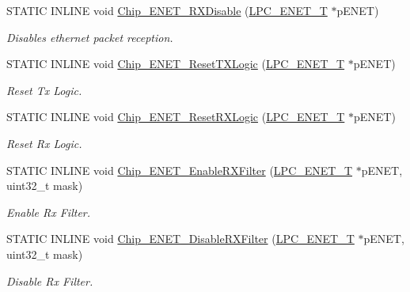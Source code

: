 \begin{DoxyCompactItemize}
S\+T\+A\+T\+I\+C I\+N\+L\+I\+N\+E void \hyperlink{group___e_n_e_t__17_x_x__40_x_x_gaef60a4790dcce43254081ea7fe5a22d4}{Chip\+\_\+\+E\+N\+E\+T\+\_\+\+R\+X\+Disable} (\hyperlink{struct_l_p_c___e_n_e_t___t}{L\+P\+C\+\_\+\+E\+N\+E\+T\+\_\+\+T} $\ast$p\+E\+N\+E\+T)
\begin{DoxyCompactList}\small\item\em Disables ethernet packet reception. \end{DoxyCompactList}\item 
S\+T\+A\+T\+I\+C I\+N\+L\+I\+N\+E void \hyperlink{group___e_n_e_t__17_x_x__40_x_x_ga23cc17a06ee9e42b4f1327cd792a2a8e}{Chip\+\_\+\+E\+N\+E\+T\+\_\+\+Reset\+T\+X\+Logic} (\hyperlink{struct_l_p_c___e_n_e_t___t}{L\+P\+C\+\_\+\+E\+N\+E\+T\+\_\+\+T} $\ast$p\+E\+N\+E\+T)
\begin{DoxyCompactList}\small\item\em Reset Tx Logic. \end{DoxyCompactList}\item 
S\+T\+A\+T\+I\+C I\+N\+L\+I\+N\+E void \hyperlink{group___e_n_e_t__17_x_x__40_x_x_gaddd915f4c5b177bef0cd29d882ed3e6f}{Chip\+\_\+\+E\+N\+E\+T\+\_\+\+Reset\+R\+X\+Logic} (\hyperlink{struct_l_p_c___e_n_e_t___t}{L\+P\+C\+\_\+\+E\+N\+E\+T\+\_\+\+T} $\ast$p\+E\+N\+E\+T)
\begin{DoxyCompactList}\small\item\em Reset Rx Logic. \end{DoxyCompactList}\item 
S\+T\+A\+T\+I\+C I\+N\+L\+I\+N\+E void \hyperlink{group___e_n_e_t__17_x_x__40_x_x_ga87335faab88d9a16579596f4a0a6ce14}{Chip\+\_\+\+E\+N\+E\+T\+\_\+\+Enable\+R\+X\+Filter} (\hyperlink{struct_l_p_c___e_n_e_t___t}{L\+P\+C\+\_\+\+E\+N\+E\+T\+\_\+\+T} $\ast$p\+E\+N\+E\+T, uint32\+\_\+t mask)
\begin{DoxyCompactList}\small\item\em Enable Rx Filter. \end{DoxyCompactList}\item 
S\+T\+A\+T\+I\+C I\+N\+L\+I\+N\+E void \hyperlink{group___e_n_e_t__17_x_x__40_x_x_ga591bdc31e1ca992c3ac642c8d64d3ac9}{Chip\+\_\+\+E\+N\+E\+T\+\_\+\+Disable\+R\+X\+Filter} (\hyperlink{struct_l_p_c___e_n_e_t___t}{L\+P\+C\+\_\+\+E\+N\+E\+T\+\_\+\+T} $\ast$p\+E\+N\+E\+T, uint32\+\_\+t mask)
\begin{DoxyCompactList}\small\item\em Disable Rx Filter. \end{DoxyCompactList}\item 

\end{DoxyCompactItemize}
